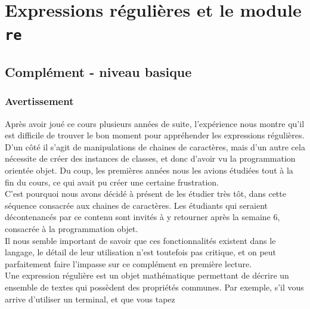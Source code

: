     \hypertarget{expressions-ruxe9guliuxe8res-et-le-module-re}{%
\section{\texorpdfstring{Expressions régulières et le module
\texttt{re}}{Expressions régulières et le module re}}\label{expressions-ruxe9guliuxe8res-et-le-module-re}}

    \hypertarget{compluxe9ment---niveau-basique}{%
\subsection{Complément - niveau
basique}\label{compluxe9ment---niveau-basique}}

    \hypertarget{avertissement}{%
\subsubsection{Avertissement}\label{avertissement}}

Après avoir joué ce cours plusieurs années de suite, l'expérience nous
montre qu'il est difficile de trouver le bon moment pour appréhender les
expressions régulières.\\

D'un côté il s'agit de manipulations de chaines de caractères, mais d'un
autre cela nécessite de créer des instances de classes, et donc d'avoir
vu la programmation orientée objet. Du coup, les premières années nous
les avions étudiées tout à la fin du cours, ce qui avait pu créer une
certaine frustration.\\

C'est pourquoi nous avons décidé à présent de les étudier très tôt, dans
cette séquence consacrée aux chaines de caractères. Les étudiants qui
seraient décontenancés par ce contenu sont invités à y retourner après
la semaine 6, consacrée à la programmation objet.\\

Il nous semble important de savoir que ces fonctionnalités existent dans
le langage, le détail de leur utilisation n'est toutefois pas critique,
et on peut parfaitement faire l'impasse sur ce complément en première
lecture.\\

    Une expression régulière est un objet mathématique permettant de décrire
un ensemble de textes qui possèdent des propriétés communes. Par
exemple, s'il vous arrive d'utiliser un terminal, et que vous tapez

